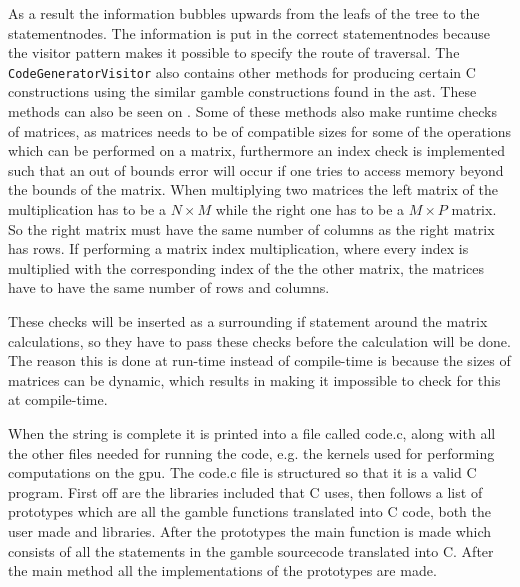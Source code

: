 As a result the information bubbles upwards from the leafs of the tree to the statementnodes.
The information is put in the correct statementnodes because the visitor pattern makes it possible to specify the route of traversal.
The \texttt{CodeGeneratorVisitor} also contains other methods for producing certain C constructions using the similar \gls{gamble} constructions found in the \acrshort{ast}.
These methods can also be seen on .
Some of these methods also make runtime checks of matrices, as matrices needs to be of compatible sizes for some of the operations which can be performed on a matrix, furthermore an index check is implemented such that an out of bounds error will occur if one tries to access memory beyond the bounds of the matrix.
When multiplying two matrices the left matrix of the multiplication has to be a $ N \times M $ while the right one has to be a $ M \times P $ matrix.
So the right matrix must have the same number of columns as the right matrix has rows.
If performing a matrix index multiplication, where every index is multiplied with the corresponding index of the the other matrix, the matrices have to have the same number of rows and columns.

These checks will be inserted as a surrounding if statement around the matrix calculations, so they have to pass these checks before the calculation will be done.
The reason this is done at run-time instead of compile-time is because the sizes of matrices can be dynamic, which results in making it impossible to check for this at compile-time.

When the string is complete it is printed into a file called code.c, along with all the other files needed for running the code, e.g. the kernels used for performing computations on the \acrshort{gpu}.
The code.c file is structured so that it is a valid C program.
First off are the libraries included that C uses, then follows a list of prototypes which are all the gamble functions translated into C code, both the user made and libraries.
After the prototypes the main function is made which consists of all the statements in the gamble sourcecode translated into C.
After the main method all the implementations of the prototypes are made.